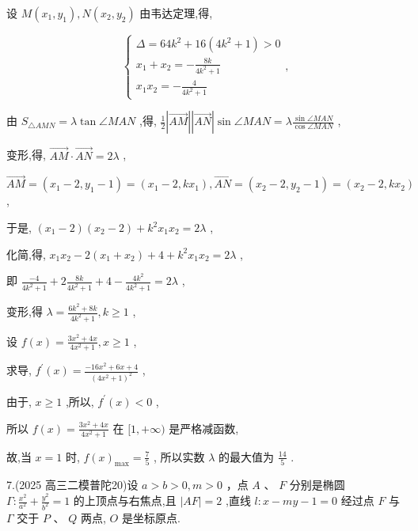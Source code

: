 \documentclass[10pt]{article}
\begin{document}
设 \(M\left( {{x}_{1},{y}_{1}}\right) ,N\left( {{x}_{2},{y}_{2}}\right)\) 由韦达定理,得,

\[
\left\{  {\begin{matrix} \Delta  = {64}{k}^{2} + {16}\left( {4{k}^{2} + 1}\right)  > 0 \\  {x}_{1} + {x}_{2} =  - \frac{8k}{4{k}^{2} + 1} \\  {x}_{1}{x}_{2} =  - \frac{4}{4{k}^{2} + 1} \end{matrix},}\right.
\]

由 \({S}_{\bigtriangleup {AMN}} = \lambda \tan \angle {MAN}\) ,得, \(\frac{1}{2}\left| \overrightarrow{AM}\right| \left| \overrightarrow{AN}\right| \sin \angle {MAN} = \lambda \frac{\sin \angle {MAN}}{\cos \angle {MAN}}\) ,

变形,得, \(\overrightarrow{AM} \cdot  \overrightarrow{AN} = {2\lambda }\) ,

\(\overrightarrow{AM} = \left( {{x}_{1} - 2,{y}_{1} - 1}\right)  = \left( {{x}_{1} - 2,k{x}_{1}}\right) ,\overrightarrow{AN} = \left( {{x}_{2} - 2,{y}_{2} - 1}\right)  = \left( {{x}_{2} - 2,k{x}_{2}}\right)\) ,

于是, \(\left( {{x}_{1} - 2}\right) \left( {{x}_{2} - 2}\right)  + {k}^{2}{x}_{1}{x}_{2} = {2\lambda }\) ,

化简,得, \({x}_{1}{x}_{2} - 2\left( {{x}_{1} + {x}_{2}}\right)  + 4 + {k}^{2}{x}_{1}{x}_{2} = {2\lambda }\) ,

即 \(\frac{-4}{4{k}^{2} + 1} + 2\frac{8k}{4{k}^{2} + 1} + 4 - \frac{4{k}^{2}}{4{k}^{2} + 1} = {2\lambda }\) ,

变形,得 \(\lambda  = \frac{6{k}^{2} + {8k}}{4{k}^{2} + 1},k \geq  1\) ,

设 \(f\left( x\right)  = \frac{3{x}^{2} + {4x}}{4{x}^{2} + 1},x \geq  1\) ,

求导, \({f}^{\prime }\left( x\right)  = \frac{-{16}{x}^{2} + {6x} + 4}{{\left( 4{x}^{2} + 1\right) }^{2}}\) ,

由于, \(x \geq  1\) ,所以, \({f}^{\prime }\left( x\right)  < 0\) ,

所以 \(f\left( x\right)  = \frac{3{x}^{2} + {4x}}{4{x}^{2} + 1}\) 在 \(\lbrack 1, + \infty )\) 是严格减函数,

故,当 \(x = 1\) 时, \(f{\left( x\right) }_{\max } = \frac{7}{5}\) , 所以实数 \(\lambda\) 的最大值为 \(\frac{14}{5}\) .

7.(2025 高三二模普陀20)设 \(a > b > 0,m > 0\) ，点 \(A\) 、 \(F\) 分别是椭圆 \(\Gamma  : \frac{{x}^{2}}{{a}^{2}} + \frac{{y}^{2}}{{b}^{2}} = 1\) 的上顶点与右焦点,且 \(\left| {AF}\right|  = 2\) ,直线 \(l : x - {my} - 1 = 0\) 经过点 \(F\) 与 \(\Gamma\) 交于 \(P\text{ 、 }Q\) 两点, \(O\) 是坐标原点.
\end{document}

